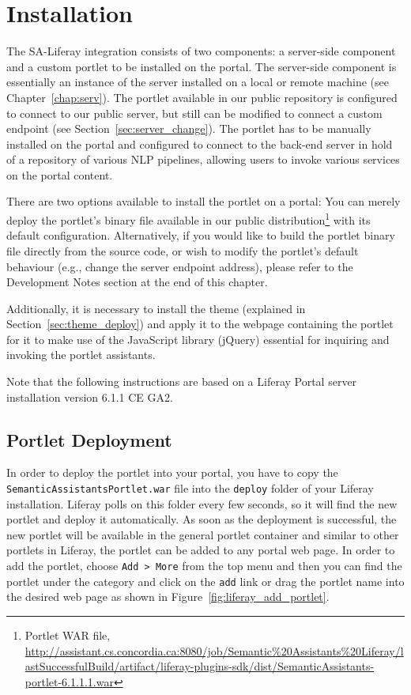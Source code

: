 \noindent

\section{Installation}
The SA-Liferay integration consists of two components: a server-side component and a custom portlet to be installed on the portal. The server-side component is essentially an instance of the \sa server installed on a local or remote machine (see Chapter~\ref{chap:serv}). The \sa portlet available in our public repository is configured to connect to our public \sa server, but still can be modified to connect a custom endpoint (see Section~\ref{sec:server_change}). The \sa portlet has to be manually installed on the portal and configured to connect to the back-end \sa server in hold of a repository of various NLP pipelines, allowing users to invoke various services on the portal content. 

There are two options available to install the \sa portlet on a portal: You can merely deploy the portlet's binary file available in our public distribution\footnote{\sa Portlet WAR file, \url{http://assistant.cs.concordia.ca:8080/job/Semantic\%20Assistants\%20Liferay/lastSuccessfulBuild/artifact/liferay-plugins-sdk/dist/SemanticAssistants-portlet-6.1.1.1.war}} with its default configuration. Alternatively, if you would like to build the portlet binary file directly from the source code, or wish to modify the portlet's default behaviour (e.g., change the \sa server endpoint address), please refer to the Development Notes section at the end of this chapter.

Additionally, it is necessary to install the \sa theme (explained in Section~\ref{sec:theme_deploy}) and apply it to the webpage containing the \sa portlet for it to make use of the JavaScript library (jQuery) essential for inquiring and invoking the \sa portlet assistants. 

Note that the following instructions are based on a Liferay Portal server installation version 6.1.1 CE GA2. 

\subsection{\sa Portlet Deployment}
In order to deploy the \sa portlet into your portal, you have to copy the \texttt{SemanticAssistantsPortlet.war} file into the \texttt{deploy} folder of your Liferay installation. Liferay polls on this folder every few seconds, so it will find the new portlet and deploy it automatically. As soon as the deployment is successful, the new portlet will be available in the general portlet container and similar to other portlets in Liferay, the \sa portlet can be added to any portal web page. In order to add the \sa portlet, choose \texttt{Add \textgreater~More} from the top menu and then you can find the portlet under the \sa category and click on the \texttt{add} link or drag the portlet name into the desired web page as shown in Figure~\ref{fig:liferay_add_portlet}.

